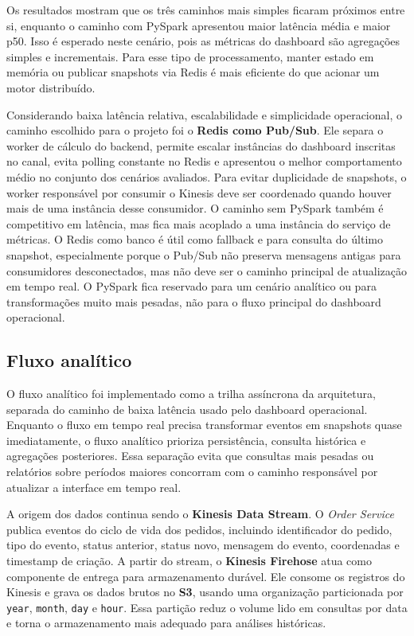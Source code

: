 ﻿\documentclass{article}
\begin{document}
Os resultados mostram que os tr\^es caminhos mais simples ficaram pr\'oximos entre si, enquanto o caminho com PySpark apresentou maior lat\^encia m\'edia e maior p50. Isso \'e esperado neste cen\'ario, pois as m\'etricas do dashboard s\~ao agrega\c{c}\~oes simples e incrementais. Para esse tipo de processamento, manter estado em mem\'oria ou publicar snapshots via Redis \'e mais eficiente do que acionar um motor distribu\'ido.

Considerando baixa lat\^encia relativa, escalabilidade e simplicidade operacional, o caminho escolhido para o projeto foi o \textbf{Redis como Pub/Sub}. Ele separa o worker de c\'alculo do backend, permite escalar inst\^ancias do dashboard inscritas no canal, evita polling constante no Redis e apresentou o melhor comportamento m\'edio no conjunto dos cen\'arios avaliados. Para evitar duplicidade de snapshots, o worker respons\'avel por consumir o Kinesis deve ser coordenado quando houver mais de uma inst\^ancia desse consumidor. O caminho sem PySpark tamb\'em \'e competitivo em lat\^encia, mas fica mais acoplado a uma inst\^ancia do servi\c{c}o de m\'etricas. O Redis como banco \'e \'util como fallback e para consulta do \'ultimo snapshot, especialmente porque o Pub/Sub n\~ao preserva mensagens antigas para consumidores desconectados, mas n\~ao deve ser o caminho principal de atualiza\c{c}\~ao em tempo real. O PySpark fica reservado para um cen\'ario anal\'itico ou para transforma\c{c}\~oes muito mais pesadas, n\~ao para o fluxo principal do dashboard operacional.
\subsection{Fluxo anal\'itico}

O fluxo anal\'itico foi implementado como a trilha ass\'incrona da arquitetura, separada do caminho de baixa lat\^encia usado pelo dashboard operacional. Enquanto o fluxo em tempo real precisa transformar eventos em snapshots quase imediatamente, o fluxo anal\'itico prioriza persist\^encia, consulta hist\'orica e agrega\c{c}\~oes posteriores. Essa separa\c{c}\~ao evita que consultas mais pesadas ou relat\'orios sobre per\'iodos maiores concorram com o caminho respons\'avel por atualizar a interface em tempo real.

A origem dos dados continua sendo o \textbf{Kinesis Data Stream}. O \textit{Order Service} publica eventos do ciclo de vida dos pedidos, incluindo identificador do pedido, tipo do evento, status anterior, status novo, mensagem do evento, coordenadas e timestamp de cria\c{c}\~ao. A partir do stream, o \textbf{Kinesis Firehose} atua como componente de entrega para armazenamento dur\'avel. Ele consome os registros do Kinesis e grava os dados brutos no \textbf{S3}, usando uma organiza\c{c}\~ao particionada por \texttt{year}, \texttt{month}, \texttt{day} e \texttt{hour}. Essa parti\c{c}\~ao reduz o volume lido em consultas por data e torna o armazenamento mais adequado para an\'alises hist\'oricas.
\end{document}
